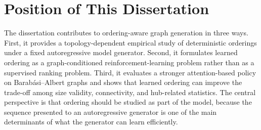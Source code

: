 \section{Position of This Dissertation}
\label{sec:related-position}

The dissertation contributes to ordering-aware graph generation in three ways. First, it provides a topology-dependent empirical study of deterministic orderings under a fixed autoregressive model generator. Second, it formulates learned ordering as a graph-conditioned reinforcement-learning problem rather than as a supervised ranking problem. Third, it evaluates a stronger attention-based policy on Barab\'asi--Albert graphs and shows that learned ordering can improve the trade-off among size validity, connectivity, and hub-related statistics. The central perspective is that ordering should be studied as part of the model, because the sequence presented to an autoregressive generator is one of the main determinants of what the generator can learn efficiently.

